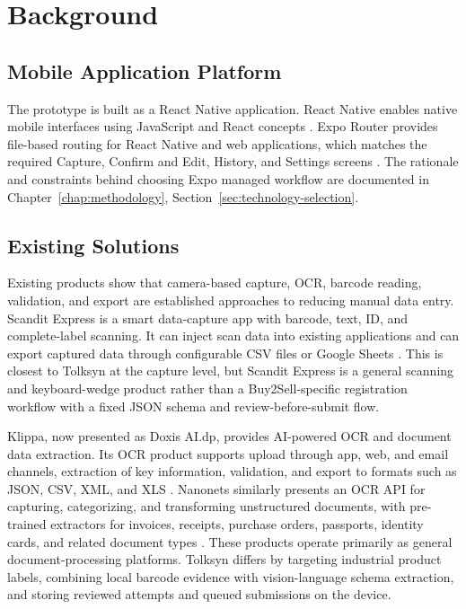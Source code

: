 \chapter{Background}
\label{chap:background}

\section{Mobile Application Platform}

The prototype is built as a React Native application. React Native enables native mobile interfaces using JavaScript and React concepts \cite{react-native}. Expo Router provides file-based routing for React Native and web applications, which matches the required Capture, Confirm and Edit, History, and Settings screens \cite{expo-router}. The rationale and constraints behind choosing Expo managed workflow are documented in Chapter~\ref{chap:methodology}, Section~\ref{sec:technology-selection}.

\section{Existing Solutions}

Existing products show that camera-based capture, OCR, barcode reading, validation, and export are established approaches to reducing manual data entry. Scandit Express is a smart data-capture app with barcode, text, ID, and complete-label scanning. It can inject scan data into existing applications and can export captured data through configurable CSV files or Google Sheets \cite{scandit-express}. This is closest to Tolksyn at the capture level, but Scandit Express is a general scanning and keyboard-wedge product rather than a Buy2Sell-specific registration workflow with a fixed JSON schema and review-before-submit flow.

Klippa, now presented as Doxis AI.dp, provides AI-powered OCR and document data extraction. Its OCR product supports upload through app, web, and email channels, extraction of key information, validation, and export to formats such as JSON, CSV, XML, and XLS \cite{klippa-ocr}. Nanonets similarly presents an OCR API for capturing, categorizing, and transforming unstructured documents, with pre-trained extractors for invoices, receipts, purchase orders, passports, identity cards, and related document types \cite{nanonets-ocr-api}. These products operate primarily as general document-processing platforms. Tolksyn differs by targeting industrial product labels, combining local barcode evidence with vision-language schema extraction, and storing reviewed attempts and queued submissions on the device.

